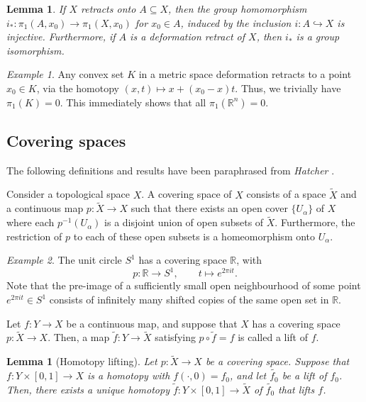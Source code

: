 \documentclass[12pt]{article}
\newcommand{\R}{\mathbb{R}}
\newtheorem{lemma}[theorem]{Lemma}
\theoremstyle{definition}
\theoremstyle{remark}
\newtheorem*{example}{Example}
\begin{document}
    \begin{lemma}
        If $X$ retracts onto $A \subseteq X$, then the group homomorphism $i_*\colon
        \pi_1(A, x_0) \to \pi_1(X, x_0)$ for $x_0 \in A$, induced by the inclusion
        $i\colon A \hookrightarrow X$ is injective. Furthermore, if $A$ is a
        deformation retract of $X$, then $i_*$ is a group isomorphism.
    \end{lemma}

    \begin{example}
        Any convex set $K$ in a metric space deformation retracts to a point $x_0 \in
        K$, via the homotopy $(x, t) \mapsto x + (x_0 - x)t$. Thus, we trivially have
        $\pi_1(K) = 0$. This immediately shows that all $\pi_1(\R^n) = 0$.
    \end{example}



    \subsection{Covering spaces}

    The following definitions and results have been paraphrased from \emph{Hatcher}
    \cite{hatcher}.

    Consider a topological space $X$. A covering space of $X$ consists of a space
    $\tilde{X}$ and a continuous map $p\colon \tilde{X} \to X$ such that there exists
    an open cover $\{U_\alpha\}$ of $X$ where each $p^{-1}(U_\alpha)$ is a disjoint
    union of open subsets of $\tilde{X}$. Furthermore, the restriction of $p$ to each
    of these open subsets is a homeomorphism onto $U_\alpha$.

    \begin{example}
        The unit circle $S^1$ has a covering space $\R$, with \[
            p\colon \R \to S^1, \qquad t \mapsto e^{2\pi i t}.
        \] Note that the pre-image of a sufficiently small open neighbourhood of some
        point $e^{2\pi i t} \in S^1$ consists of infinitely many shifted copies of
        the same open set in $\R$.
    \end{example}

    Let $f\colon Y \to X$ be a continuous map, and suppose that $X$ has a covering
    space $p\colon \tilde{X} \to X$. Then, a map $\tilde{f}\colon Y \to \tilde{X}$
    satisfying $p\circ \tilde{f} = f$ is called a lift of $f$. \\

    \begin{lemma}[Homotopy lifting]
        Let $p\colon \tilde{X} \to X$ be a covering space. Suppose that $f\colon Y
        \times [0, 1] \to X$ is a homotopy with $f(\cdot, 0) = f_0$, and let
        $\tilde{f_0}$ be a lift of $f_0$. Then, there exists a unique homotopy
        $\tilde{f}\colon Y \times [0, 1] \to \tilde{X}$ of $\tilde{f_0}$ that lifts
        $f$.
    \end{lemma}
\end{document}

